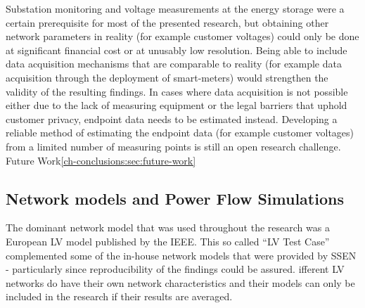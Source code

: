 Substation monitoring and voltage measurements at the energy storage were a certain prerequisite for most of the presented research, but obtaining other network parameters in reality (for example customer voltages) could only be done at significant financial cost or at unusably low resolution.
Being able to include data acquisition mechanisms that are comparable to reality (for example data acquisition through the deployment of smart-meters) would strengthen the validity of the resulting findings.
In cases where data acquisition is not possible either due to the lack of measuring equipment or the legal barriers that uphold customer privacy, endpoint data needs to be estimated instead.
Developing a reliable method of estimating the endpoint data (for example customer voltages) from a limited number of measuring points is still an open research challenge.
Future Work\ref{ch-conclusions:sec:future-work}

\subsection{Network models and Power Flow Simulations}

The dominant network model that was used throughout the research was a European LV model published by the IEEE.
This so called ``LV Test Case'' complemented some of the in-house network models that were provided by SSEN - particularly since reproducibility of the findings could be assured.
ifferent LV networks do have their own network characteristics and their models can only be included in the research if their results are averaged.

